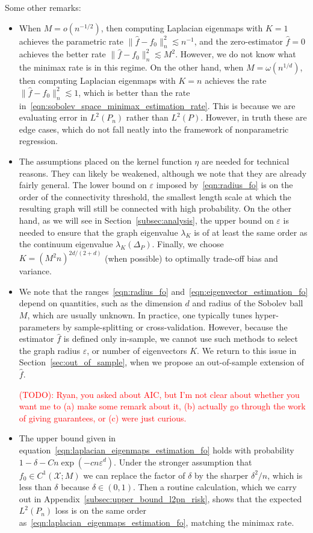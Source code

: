 \documentclass{article}
\newcommand{\1}{\mathbf{1}}
\newcommand{\mc}[1]{\mathcal{#1}}
\newcommand{\wh}[1]{\widehat{#1}}
\theoremstyle{alden}
\theoremstyle{aldenthm}
\theoremstyle{definition}
\theoremstyle{remark}
\begin{document}
Some other remarks:
\begin{itemize}
	\item When $M = o(n^{-1/2})$, then computing Laplacian eigenmaps with $K = 1$ achieves the parametric rate $\|\wh{f} - f_0\|_n^2 \lesssim n^{-1}$, and the zero-estimator $\wh{f} = 0$ achieves the better rate $\|\wh{f} - f_0\|_n^2 \lesssim M^2$. However, we do not know what the minimax rate is in this regime. On the other hand, when $M = \omega(n^{1/d})$, then computing Laplacian eigenmaps with $K = n$ achieves the rate $\|\wh{f} - f_0\|_n^2 \lesssim 1$, which is better than the rate in~\eqref{eqn:sobolev_space_minimax_estimation_rate}. This is because we are evaluating error in $L^2(P_n)$ rather than $L^2(P)$. However, in truth these are edge cases, which do not fall neatly into the framework of nonparametric regression. 
	\item The assumptions placed on the kernel function $\eta$ are needed for technical reasons. They can likely be weakened, although we note that they are already fairly general. The lower bound on $\varepsilon$ imposed by~\eqref{eqn:radius_fo} is on the order of the connectivity threshold, the smallest length scale at which the resulting graph will still be connected with high probability. On the other hand, as we will see in Section~\ref{subsec:analysis}, the upper bound on $\varepsilon$ is needed to ensure that the graph eigenvalue $\lambda_K$ is of at least the same order as the continuum eigenvalue $\lambda_K(\Delta_P)$. Finally, we choose $K = (M^2n)^{2d/(2 + d)}$ (when possible) to optimally trade-off bias and variance.
	\item We note that the ranges~\eqref{eqn:radius_fo} and~\eqref{eqn:eigenvector_estimation_fo} depend on quantities, such as the dimension $d$ and radius of the Sobolev ball $M$, which are usually unknown. In practice, one typically tunes hyper-parameters by sample-splitting or cross-validation. However, because the estimator $\wh{f}$ is defined only in-sample, we cannot use such methods to select the graph radius $\varepsilon$, or number of eigenvectors $K$. We return to this issue in Section~\ref{sec:out_of_sample}, when we propose an out-of-sample extension of $\wh{f}$. 
	
	\textcolor{red}{(TODO): Ryan, you asked about AIC, but I'm not clear about whether you want me to (a) make some remark about it, (b) actually go through the work of giving guarantees, or (c) were just curious.}
	
	\item The upper bound given in equation~\eqref{eqn:laplacian_eigenmaps_estimation_fo} holds with probability $1 - \delta - Cn\exp(-cn\varepsilon^d)$. Under the stronger assumption that $f_0 \in C^1(\mc{X};M)$ we can replace the factor of $\delta$ by the sharper $\delta^2/n$, which is less than $\delta$ because $\delta \in (0,1)$. Then a routine calculation, which we carry out in Appendix~\ref{subsec:upper_bound_l2pn_risk}, shows that the expected $L^2(P_n)$ loss is on the same order as~\eqref{eqn:laplacian_eigenmaps_estimation_fo}, matching the minimax rate.
\end{itemize}
\end{document}
